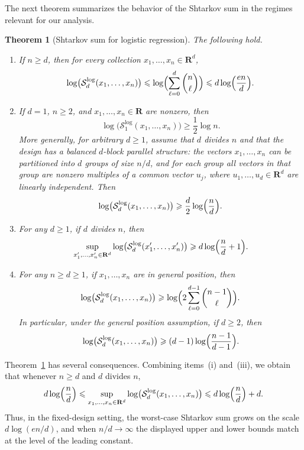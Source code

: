 \documentclass[11pt, letterpaper, hidelinks]{article}
\newcommand{\R}{\mathbf R}
\newcommand{\1}{\mathbf 1}
\renewcommand{\le}{\leqslant}
\renewcommand{\ge}{\geqslant}
\renewcommand{\geq}{\geqslant}
\theoremstyle{plain}
\newtheorem{theorem}{Theorem}[section]
\theoremstyle{definition}
\begin{document}
The next theorem summarizes the behavior of the Shtarkov sum in the regimes relevant for our analysis. 

\begin{theorem}[Shtarkov sum for logistic regression]
\label{thm:shtarkov-logistic}
The following hold.
\begin{enumerate}[label=(\roman*)]
\item
\label{item:shtarkov-upper}
If $n \geq d$, then for every collection $x_1,\dots,x_n \in \R^d$,
\[
\log\bigl(\mathcal{S}_d^{\operatorname{log}}(x_1,\dots,x_n)\bigr)
\le
\log\Bigl(\sum_{\ell=0}^{d}\binom{n}{\ell}\Bigr)
\le
d\log\Bigl(\frac{en}{d}\Bigr).
\]

\item
If $d=1$, $n \geq 2$, and $x_1,\dots,x_n \in \R$ are nonzero, then
\[
\log\bigl(\mathcal{S}_1^{\operatorname{log}}(x_1,\dots,x_n)\bigr)
\ge
\frac12 \log n.
\]
More generally, for arbitrary $d \geq 1$, assume that $d$ divides $n$ and that the design has a balanced $d$-block parallel structure: the vectors $x_1,\dots,x_n$ can be partitioned into $d$ groups of size $n/d$, and for each group all vectors in that group are nonzero multiples of a common vector $u_j$, where $u_1,\dots,u_d \in \R^d$ are linearly independent. Then
\[
\log\bigl(\mathcal{S}_d^{\operatorname{log}}(x_1,\dots,x_n)\bigr)
\ge
\frac{d}{2}\log\Bigl(\frac{n}{d}\Bigr).
\]

\item
For any $d \geq 1$, if $d$ divides $n$, then
\[
\sup_{x'_1,\dots,x'_n \in \R^d}
\log\bigl(\mathcal{S}_d^{\operatorname{log}}(x'_1,\dots,x'_n)\bigr)
\ge
d\log\Bigl(\frac{n}{d}+1\Bigr).
\]

\item
For any $n \geq d \geq 1$, if $x_1,\dots,x_n$ are in general position, then
\[
\log\bigl(\mathcal{S}_d^{\operatorname{log}}(x_1,\dots,x_n)\bigr)
\ge
\log\Bigl(2\sum_{\ell=0}^{d-1}\binom{n-1}{\ell}\Bigr).
\]
In particular, under the general position assumption, if $d \geq 2$, then
\[
\log\bigl(\mathcal{S}_d^{\operatorname{log}}(x_1,\dots,x_n)\bigr)
\ge
(d-1)\log\Bigl(\frac{n-1}{d-1}\Bigr).
\]
\end{enumerate}
\end{theorem}

Theorem~\ref{thm:shtarkov-logistic} has several consequences. Combining items~(i) and~(iii), we obtain that whenever \(n \geq d\) and \(d\) divides \(n\),
\[
d\log\Bigl(\frac{n}{d}\Bigr)
\le
\sup_{x_1,\dots,x_n \in \R^d}
\log\bigl(\mathcal{S}_d^{\operatorname{log}}(x_1,\dots,x_n)\bigr)
\le
d\log\Bigl(\frac{n}{d}\Bigr)+d.
\]
Thus, in the fixed-design setting, the worst-case Shtarkov sum grows on the scale \(d\log(en/d)\), and when $n/d\to\infty$ the displayed upper and lower bounds match at the level of the leading constant.
\end{document}
